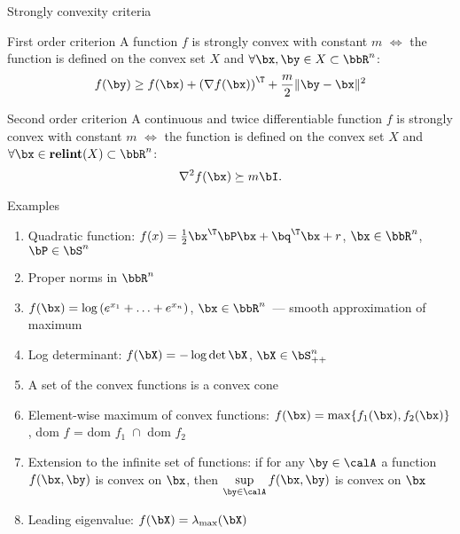 \documentclass[12pt]{beamer}
\begin{document}
\begin{frame}{Strongly convexity criteria}

\begin{block}{First order criterion}
A function $f$ is strongly convex with constant $m$ $\Leftrightarrow$ the function is defined on the convex set $X$ and $\forall \bx, \by \in X \subset \bbR^n$:
\vspace{-4mm}
\[
f(\by) \geq f(\bx) + \left( \nabla f(\bx) \right)^{\T} + \frac{m}{2}\| \by - \bx \|^2
\]
\end{block}

\begin{block}{Second order criterion}
A continuous and twice differentiable function $f$ is strongly convex with constant $m$ $\Leftrightarrow$ the function is defined on the convex set $X$ and $\forall \bx \in \text{\bf relint}(X) \subset \bbR^n$:
\vspace{-2mm}
\[
\nabla^2 f(\bx) \succeq m\bI.
\]
\end{block}
\end{frame}

\begin{frame}{Examples}
\begin{enumerate}
\item Quadratic function: $f(x) = \frac{1}{2}\bx^{\T}\bP\bx + \bq^{\T}\bx + r$, $\bx \in \bbR^n$, $\bP \in \bS^n$
\item Proper norms in $\bbR^n$
\item $f(\bx) = \log{(e^{x_1} + \ldots + e^{x_n})}$, $\bx \in \bbR^n$~--- smooth approximation of maximum
\item Log determinant: $f(\bX) = -\log{\det{\bX}}$, $\bX \in \bS^n_{++}$
\item A set of the convex functions is a convex cone
\item Element-wise maximum of convex functions: $f(\bx) = \max\{f_1(\bx), f_2(\bx)\}$, dom $f$ = dom $f_1 \; \cap $ dom $f_2$
\item Extension to the infinite set of functions: if for any $\by \in \calA$ a function $f(\bx, \by)$ is convex on $\bx$, then $\sup\limits_{\by \in \calA} f(\bx, \by)$ is convex on $\bx$
\item Leading eigenvalue: $f(\bX) = \lambda_{\max}(\bX)$ 
\end{enumerate}
\end{frame}
\end{document}
